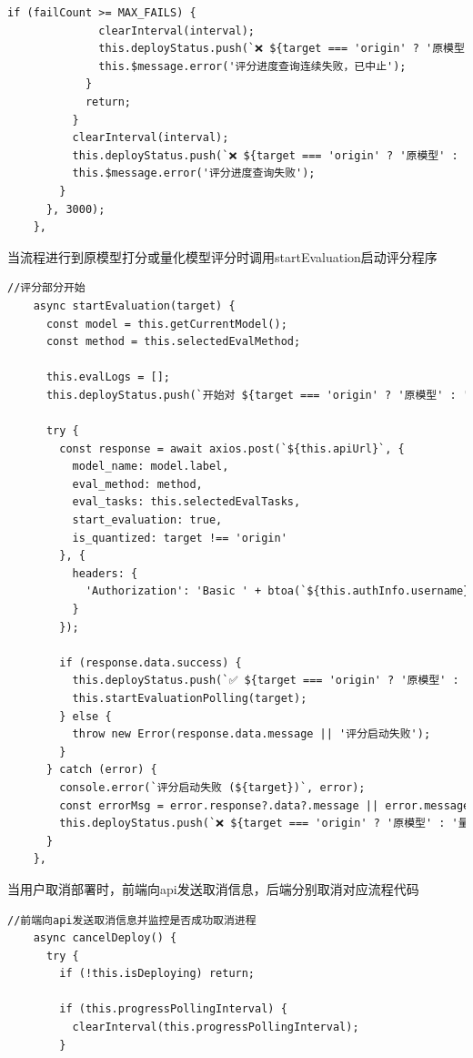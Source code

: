 \documentclass[AutoFakeBold,AutoFakeSlant,language=chinese,degree=bachelor]{sustechthesis}
\begin{document}
\begin{itemize}
\begin{lstlisting}[language=HTML]
            if (failCount >= MAX_FAILS) {
              clearInterval(interval);
              this.deployStatus.push(`❌ ${target === 'origin' ? '原模型' : '量化模型'} 连续多次无法获取评分进度，任务可能失败`);
              this.$message.error('评分进度查询连续失败，已中止');
            }
            return;
          }
          clearInterval(interval);
          this.deployStatus.push(`❌ ${target === 'origin' ? '原模型' : '量化模型'} 评分进度获取失败: ${errMsg}`);
          this.$message.error('评分进度查询失败');
        }
      }, 3000);
    },
    \end{lstlisting}
    当流程进行到原模型打分或量化模型评分时调用startEvaluation启动评分程序
    \begin{lstlisting}[language=HTML]
    //评分部分开始
    async startEvaluation(target) {
      const model = this.getCurrentModel();
      const method = this.selectedEvalMethod;

      this.evalLogs = [];
      this.deployStatus.push(`开始对 ${target === 'origin' ? '原模型' : '量化模型'} 进行评分（方法：${method}）...`);

      try {
        const response = await axios.post(`${this.apiUrl}`, {
          model_name: model.label,
          eval_method: method,
          eval_tasks: this.selectedEvalTasks,
          start_evaluation: true,
          is_quantized: target !== 'origin'
        }, {
          headers: {
            'Authorization': 'Basic ' + btoa(`${this.authInfo.username}:${this.authInfo.password}`)
          }
        });

        if (response.data.success) {
          this.deployStatus.push(`✅ ${target === 'origin' ? '原模型' : '量化模型'} 评分任务已启动`);
          this.startEvaluationPolling(target);
        } else {
          throw new Error(response.data.message || '评分启动失败');
        }
      } catch (error) {
        console.error(`评分启动失败 (${target})`, error);
        const errorMsg = error.response?.data?.message || error.message;
        this.deployStatus.push(`❌ ${target === 'origin' ? '原模型' : '量化模型'} 评分启动失败: ${error.message}`);
      }
    },
    \end{lstlisting}
    当用户取消部署时，前端向api发送取消信息，后端分别取消对应流程代码
    \begin{lstlisting}[language=HTML]
    //前端向api发送取消信息并监控是否成功取消进程
    async cancelDeploy() {
      try {
        if (!this.isDeploying) return;

        if (this.progressPollingInterval) {
          clearInterval(this.progressPollingInterval);
        }


\end{lstlisting}
\end{itemize}
\end{document}

